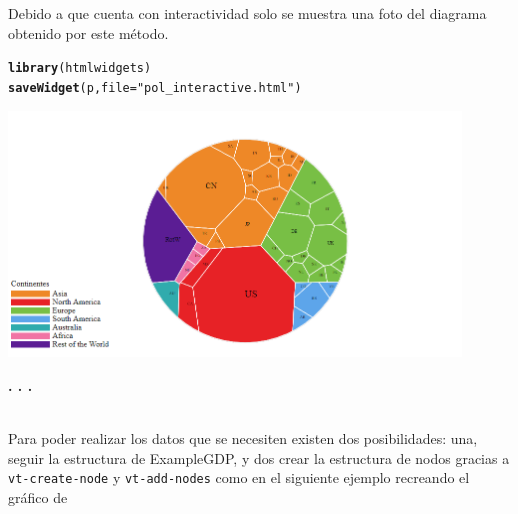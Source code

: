 \documentclass{article}\usepackage[]{graphicx}\usepackage[]{color}
\makeatletter
\newcommand{\hlstr}[1]{\textcolor[rgb]{0.192,0.494,0.8}{#1}}%
\newcommand{\hlstd}[1]{\textcolor[rgb]{0.345,0.345,0.345}{#1}}%
\newcommand{\hlkwc}[1]{\textcolor[rgb]{0.333,0.667,0.333}{#1}}%
\newcommand{\hlkwd}[1]{\textcolor[rgb]{0.737,0.353,0.396}{\textbf{#1}}}%
\newenvironment{kframe}{%
 \def\at@end@of@kframe{}%
 \ifinner\ifhmode%
  \def\at@end@of@kframe{\end{minipage}}%
  \begin{minipage}{\columnwidth}%
 \fi\fi%
 \def\FrameCommand##1{\hskip\@totalleftmargin \hskip-\fboxsep
 \colorbox{shadecolor}{##1}\hskip-\fboxsep
     \hskip-\linewidth \hskip-\@totalleftmargin \hskip\columnwidth}%
 \MakeFramed {\advance\hsize-\width
   \@totalleftmargin\z@ \linewidth\hsize
   \@setminipage}}%
 {\par\unskip\endMakeFramed%
 \at@end@of@kframe}
\newenvironment{knitrout}{}{} %
\makeatother
\begin{document}
Debido a que cuenta con interactividad solo se muestra una foto del diagrama obtenido por este m\'etodo.
\begin{knitrout}
\color{fgcolor}\begin{kframe}
\begin{alltt}
\hlkwd{library}\hlstd{(htmlwidgets)}
\hlkwd{saveWidget}\hlstd{(p,}\hlkwc{file}\hlstd{=}\hlstr{"pol_interactive.html"}\hlstd{)}
\end{alltt}
\end{kframe}
\end{knitrout}
\vbox{
    \centering
    \includegraphics[width=0.9\textwidth]{imag/pol_interactive}
}
\begin{center}
\textbf{. . .}
\end{center}
~\\
Para poder realizar los datos que se necesiten existen dos posibilidades: una, seguir la estructura de ExampleGDP, y dos crear la estructura de nodos gracias a \texttt{vt-create-node} y \texttt{vt-add-nodes} como en el siguiente ejemplo recreando el gr\'afico de %
\end{document}
